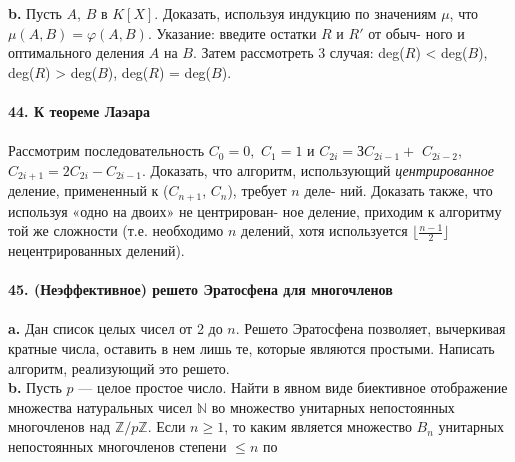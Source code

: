 \documentclass{mai_book}
\begin{document}
\noindent\hspace*{10pt}\textbf{b.} Пусть $A$, $B$ в $K[X]$. Доказать, используя индукцию по значениям\linebreak
$\mu$, что $\mu(A ,B ) = \varphi(A, B)$. Указание: введите остатки $R$ и $R'$ от обыч-\linebreak
ного и оптимального деления $A$ на $B$. Затем рассмотреть 3 случая:\linebreak
deg($R$) < deg($B$), deg($R$) > deg($B$), deg($R$) = deg($B$).
\\
\\
\noindent\textbf{44. К теореме Лаэара}\\\\
\hspace*{10pt} Рассмотрим последовательность $C_0 = 0,$ $ C_1 = 1$ и $C_{2i} = ЗC_{2i-1} +$\linebreak
$C_{2i-2},$ $C_{2i+1}=2C_{2i}-C_{2i-1}$. Доказать, что алгоритм, использующий\linebreak
\textit{центрированное} деление, примененный к ($C_{n+1}$, $C_n$), требует $n$ деле-\linebreak
ний. Доказать также, что используя «одно на двоих» не центрирован-\linebreak
ное деление, приходим к алгоритму той же сложности (т.е. необходимо\linebreak
$n$ делений, хотя используется $\lfloor\frac{n-1}{2}\rfloor$ нецентрированных делений).
\\
\\
\noindent\textbf{45. (Неэффективное) решето Эратосфена для многочленов}\\\\
\hspace*{10pt}\textbf{a.} Дан список целых чисел от 2 до $n$. Решето Эратосфена позволяет,\linebreak
вычеркивая кратные числа, оставить в нем лишь те, которые являются\linebreak
простыми. Написать алгоритм, реализующий это решето.\\
\hspace*{10pt}\textbf{b.}  Пусть $p$ — целое простое число. Найти в явном виде биективное\linebreak
отображение множества натуральных чисел $\mathbb{N}$ во множество унитарных\linebreak
непостоянных многочленов над $\mathbb{Z}/p\mathbb{Z}$. Если $n\geq 1$, то каким является\linebreak
множество $B_n$ унитарных непостоянных многочленов степени $\leq n$ по\linebreak
\end{document}
